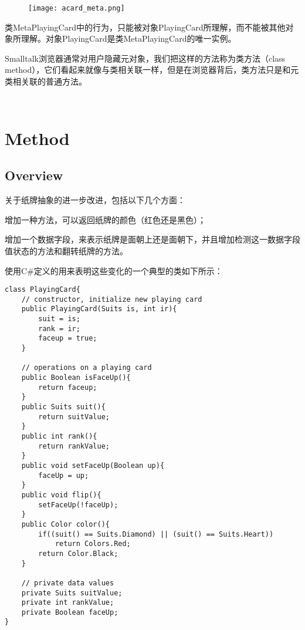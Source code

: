 \begin{figure}[htbp]
\centering
\texttt{[image: acard\_meta.png]}
\label{fig:acard_meta}
\end{figure}

类MetaPlayingCard中的行为，只能被对象PlayingCard所理解，而不能被其他对象所理解。对象PlayingCard是类MetaPlayingCard的唯一实例。

Smalltalk浏览器通常对用户隐藏元对象，我们把这样的方法称为类方法（class method），它们看起来就像与类相关联一样，但是在浏览器背后，类方法只是和元类相关联的普通方法。


\begin{lstlisting}[language=C++]

\end{lstlisting}





\begin{lstlisting}[language=C++]

\end{lstlisting}




\chapter{Method}


\section{Overview}


关于纸牌抽象的进一步改进，包括以下几个方面：

\begin{compactitem}
\item 增加一种方法，可以返回纸牌的颜色（红色还是黑色）；
\item 增加一个数据字段，来表示纸牌是面朝上还是面朝下，并且增加检测这一数据字段值状态的方法和翻转纸牌的方法。
\end{compactitem}


使用C\#定义的用来表明这些变化的一个典型的类如下所示：

\begin{lstlisting}[language={[Sharp]C}]
class PlayingCard{
	// constructor, initialize new playing card
	public PlayingCard(Suits is, int ir){
		suit = is;
		rank = ir;
		faceup = true;
	}
	
	// operations on a playing card
	public Boolean isFaceUp(){
		return faceup;
	}
	public Suits suit(){
		return suitValue;
	}
	public int rank(){
		return rankValue;
	}
	public void setFaceUp(Boolean up){
		faceUp = up;
	}
	public void flip(){
		setFaceUp(!faceUp);
	}
	public Color color(){
		if((suit() == Suits.Diamond) || (suit() == Suits.Heart))
			return Colors.Red;
		return Color.Black;
	}
	
	// private data values
	private Suits suitValue;
	private int rankValue;
	private Boolean faceUp;
}
\end{lstlisting}



